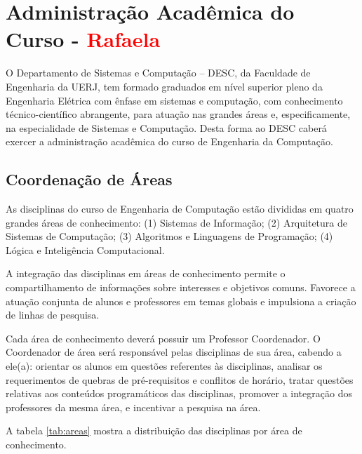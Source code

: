 \section{Administração Acadêmica do Curso - \textcolor{red}{Rafaela}}



O Departamento de Sistemas e Computação – DESC, da Faculdade de Engenharia da UERJ, tem formado graduados em nível superior pleno da Engenharia Elétrica com ênfase em sistemas e computação, com conhecimento técnico-científico abrangente, para atuação nas grandes áreas e, especificamente, na especialidade de Sistemas e Computação. Desta forma ao DESC caberá exercer a administração acadêmica do curso de Engenharia da Computação.



\subsection{Coordenação de Áreas}



As disciplinas do curso de Engenharia de Computação estão divididas em quatro grandes áreas de conhecimento: (1) Sistemas de Informação; (2) Arquitetura de Sistemas de Computação; (3) Algoritmos e Linguagens de Programação; (4) Lógica e Inteligência Computacional.



A integração das disciplinas em áreas de conhecimento permite o compartilhamento de informações sobre interesses e objetivos comuns. Favorece a atuação conjunta de alunos e professores em temas globais e impulsiona a criação de linhas de pesquisa.



Cada área de conhecimento deverá possuir um Professor Coordenador. O Coordenador de área será responsável pelas disciplinas de sua área, cabendo a ele(a): orientar os alunos em questões referentes às disciplinas, analisar os requerimentos de quebras de pré-requisitos e conflitos de horário, tratar questões relativas aos conteúdos programáticos das disciplinas, promover a integração dos professores da mesma área, e incentivar a pesquisa na área.



A tabela \ref{tab:areas} mostra a distribuição das disciplinas por área de conhecimento.



